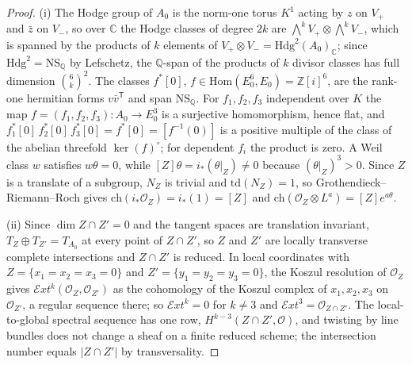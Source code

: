 \documentclass[11pt,reqno]{amsart}
\numberwithin{equation}{section}
\theoremstyle{plain}
\theoremstyle{definition}
\newcommand{\QQ}{\mathbb{Q}}
\newcommand{\ZZ}{\mathbb{Z}}
\newcommand{\CC}{\mathbb{C}}
\newcommand{\Hdg}{\mathrm{Hdg}}
\newcommand{\NS}{\mathrm{NS}}
\newcommand{\Hom}{\mathrm{Hom}}
\newcommand{\ch}{\mathrm{ch}}
\begin{document}
\begin{proof}
(i) The Hodge group of $A_{0}$ is the norm-one torus $K^{1}$ acting by $z$ on $V_{+}$ and $\bar z$ on $V_{-}$, so over $\CC$ the Hodge classes of degree $2k$ are $\bigwedge^{k}V_{+}\otimes\bigwedge^{k}V_{-}$, which is spanned by the products of $k$ elements of $V_{+}\otimes V_{-}=\Hdg^{2}(A_{0})_{\CC}$; since $\Hdg^{2}=\NS_{\QQ}$ by Lefschetz, the $\QQ$-span of the products of $k$ divisor classes has full dimension $\binom{6}{k}^{2}$. The classes $f^{*}[0]$, $f\in\Hom(E_{0}^{6},E_{0})=\ZZ[i]^{6}$, are the rank-one hermitian forms $v\bar v^{\mathsf{T}}$ and span $\NS_{\QQ}$. For $f_{1},f_{2},f_{3}$ independent over $K$ the map $f=(f_{1},f_{2},f_{3})\colon A_{0}\to E_{0}^{3}$ is a surjective homomorphism, hence flat, and $f_{1}^{*}[0]\,f_{2}^{*}[0]\,f_{3}^{*}[0]=f^{*}[0]=[f^{-1}(0)]$ is a positive multiple of the class of the abelian threefold $\ker(f)^{\circ}$; for dependent $f_{i}$ the product is zero. A Weil class $w$ satisfies $w\theta=0$, while $[Z]\theta=i_{*}(\theta|_{Z})\ne0$ because $(\theta|_{Z})^{3}>0$. Since $Z$ is a translate of a subgroup, $N_{Z}$ is trivial and $\mathrm{td}(N_{Z})=1$, so Grothendieck--Riemann--Roch gives $\ch(i_{*}\mathcal{O}_{Z})=i_{*}(1)=[Z]$ and $\ch(\mathcal{O}_{Z}\otimes L^{a})=[Z]e^{a\theta}$.

(ii) Since $\dim Z\cap Z'=0$ and the tangent spaces are translation invariant, $T_{Z}\oplus T_{Z'}=T_{A_{0}}$ at every point of $Z\cap Z'$, so $Z$ and $Z'$ are locally transverse complete intersections and $Z\cap Z'$ is reduced. In local coordinates with $Z=\{x_{1}=x_{2}=x_{3}=0\}$ and $Z'=\{y_{1}=y_{2}=y_{3}=0\}$, the Koszul resolution of $\mathcal{O}_{Z}$ gives $\mathcal{E}xt^{k}(\mathcal{O}_{Z},\mathcal{O}_{Z'})$ as the cohomology of the Koszul complex of $x_{1},x_{2},x_{3}$ on $\mathcal{O}_{Z'}$, a regular sequence there; so $\mathcal{E}xt^{k}=0$ for $k\ne3$ and $\mathcal{E}xt^{3}=\mathcal{O}_{Z\cap Z'}$. The local-to-global spectral sequence has one row, $H^{k-3}(Z\cap Z',\mathcal{O})$, and twisting by line bundles does not change a sheaf on a finite reduced scheme; the intersection number equals $|Z\cap Z'|$ by transversality.


\end{proof}
\end{document}
